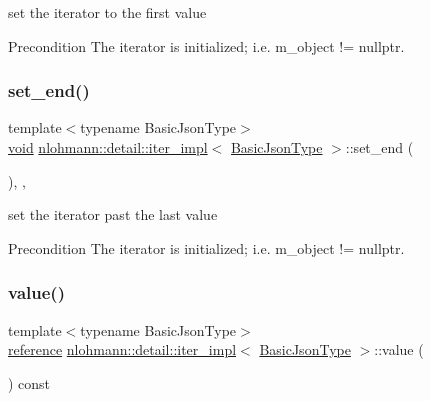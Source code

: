 set the iterator to the first value 

\begin{DoxyPrecond}{Precondition}
The iterator is initialized; i.\+e. {\ttfamily m\+\_\+object != nullptr}. 
\end{DoxyPrecond}
\mbox{\label{classnlohmann_1_1detail_1_1iter__impl_a23e50ad4c13aa62d9ac7f60a123823ee}} 
\subsubsection{\texorpdfstring{set\+\_\+end()}{set\_end()}}
{\footnotesize\ttfamily template$<$typename Basic\+Json\+Type$>$ \\
\hyperlink{namespacenlohmann_1_1detail_a59fca69799f6b9e366710cb9043aa77d}{void} \hyperlink{classnlohmann_1_1detail_1_1iter__impl}{nlohmann\+::detail\+::iter\+\_\+impl}$<$ \hyperlink{classnlohmann_1_1detail_1_1iter__impl_abf18f18793f84b0222aebb5a2a87da7a}{Basic\+Json\+Type} $>$\+::set\+\_\+end (\begin{DoxyParamCaption}{ }\end{DoxyParamCaption})\hspace{0.3cm}{\ttfamily [inline]}, {\ttfamily [private]}, {\ttfamily [noexcept]}}



set the iterator past the last value 

\begin{DoxyPrecond}{Precondition}
The iterator is initialized; i.\+e. {\ttfamily m\+\_\+object != nullptr}. 
\end{DoxyPrecond}
\mbox{\label{classnlohmann_1_1detail_1_1iter__impl_ab447c50354c6611fa2ae0100ac17845c}} 
\subsubsection{\texorpdfstring{value()}{value()}}
{\footnotesize\ttfamily template$<$typename Basic\+Json\+Type$>$ \\
\hyperlink{classnlohmann_1_1detail_1_1iter__impl_a5be8001be099c6b82310f4d387b953ce}{reference} \hyperlink{classnlohmann_1_1detail_1_1iter__impl}{nlohmann\+::detail\+::iter\+\_\+impl}$<$ \hyperlink{classnlohmann_1_1detail_1_1iter__impl_abf18f18793f84b0222aebb5a2a87da7a}{Basic\+Json\+Type} $>$\+::value (\begin{DoxyParamCaption}{ }\end{DoxyParamCaption}) const\hspace{0.3cm}{\ttfamily [inline]}}



